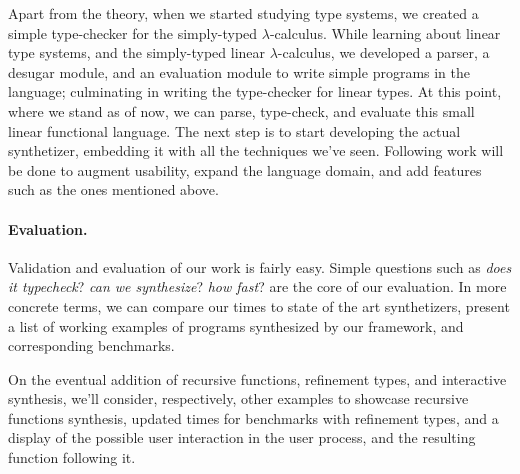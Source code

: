 \documentclass{llncs}
\newcommand{\lolli}{\multimap}
\newcommand{\tensor}{\otimes}
\newcommand{\bang}{{!}}
\newcommand{\mypara}[1]{\paragraph{\textbf{#1}.}}
\begin{document}
Apart from the theory, when we started studying type systems, we created
a simple type-checker for the simply-typed $\lambda$-calculus.
While learning about linear type systems, and the simply-typed linear
$\lambda$-calculus, we developed a parser, a desugar module, and an
evaluation module to write simple programs in the language;
culminating in writing the type-checker for linear types. At this point,
where we stand as of now, we can parse, type-check, and evaluate this
small linear functional language.
The next step is to start developing the actual synthetizer, embedding it
with all the techniques we've seen. Following work will be done to
augment usability, expand the language domain, and add features such as the
ones mentioned above.

\mypara{Evaluation} Validation and evaluation of our work is fairly
easy. Simple questions such as \emph{does it typecheck}? \emph{can
  we synthesize}? \emph{how fast}?  are the core of our evaluation. In
more concrete terms, we can compare our times to state of the art
synthetizers, present a list of working examples of programs synthesized
by our framework, and corresponding benchmarks.

On the eventual addition of recursive functions, refinement types, and
interactive synthesis, we'll consider, respectively, other examples to
showcase recursive functions synthesis, updated times for benchmarks
with refinement types, and a display of the possible user interaction
in the user process, and the resulting function following it.








\end{document}
